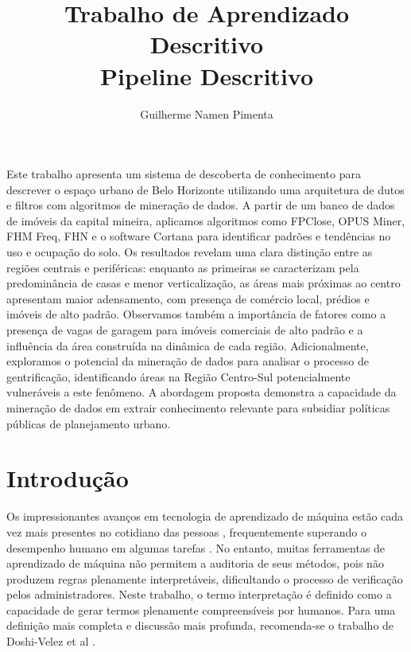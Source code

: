 \documentclass[12pt]{article}
\title{Trabalho de Aprendizado Descritivo\\ Pipeline Descritivo}
\author{Guilherme Namen Pimenta\inst{1} }
\begin{document}
 

\maketitle

  
     
\begin{resumo} 
Este trabalho apresenta um sistema de descoberta de conhecimento para descrever o espaço urbano de Belo Horizonte utilizando uma arquitetura de dutos e filtros com algoritmos de mineração de dados. A partir de um banco de dados de imóveis da capital mineira, aplicamos algoritmos como FPClose, OPUS Miner, FHM Freq, FHN e o software Cortana para identificar padrões e tendências no uso e ocupação do solo. Os resultados revelam uma clara distinção entre as regiões centrais e periféricas: enquanto as primeiras se caracterizam pela predominância de casas e menor verticalização, as áreas mais próximas ao centro apresentam maior adensamento, com presença de comércio local, prédios e imóveis de alto padrão. Observamos também a importância de fatores como a presença de vagas de garagem para imóveis comerciais de alto padrão e a influência da área construída na dinâmica de cada região. Adicionalmente, exploramos o potencial da mineração de dados para analisar o processo de gentrificação, identificando áreas na Região Centro-Sul potencialmente vulneráveis a este fenômeno. A abordagem proposta demonstra a capacidade da mineração de dados em extrair conhecimento relevante para subsidiar políticas públicas de planejamento urbano.
\end{resumo}


\section{Introdução}

Os impressionantes avanços em tecnologia de aprendizado de máquina estão cada vez mais presentes no cotidiano das pessoas \cite{doshi2017towards}, frequentemente superando o desempenho humano em algumas tarefas \cite{silver2016mastering}. No entanto, muitas ferramentas de aprendizado de máquina não permitem a auditoria de seus métodos, pois não produzem regras plenamente interpretáveis, dificultando o processo de verificação pelos administradores. Neste trabalho, o termo interpretação é definido como a capacidade de gerar termos plenamente compreensíveis por humanos. Para uma definição mais completa e discussão mais profunda, recomenda-se o trabalho de Doshi-Velez et al \cite{doshi2017towards}. 
\end{document}
